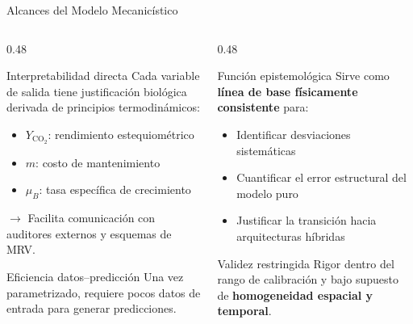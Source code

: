 \documentclass[aspectratio=169, 11pt]{beamer}
\begin{document}
\begin{frame}{Alcances del Modelo Mecanicístico}
\begin{columns}[T]
\begin{column}{0.48\textwidth}
\begin{block}{Interpretabilidad directa}
Cada variable de salida tiene justificación biológica derivada de principios termodinámicos:
\begin{itemize}
    \item $Y_{\text{CO}_2}$: rendimiento estequiométrico
    \item $m$: costo de mantenimiento
    \item $\mu_B$: tasa específica de crecimiento
\end{itemize}
$\rightarrow$ Facilita comunicación con auditores externos y esquemas de MRV.
\end{block}
\vspace{0.2cm}
\begin{exampleblock}{Eficiencia datos--predicción}
Una vez parametrizado, requiere pocos datos de entrada para generar predicciones.
\end{exampleblock}
\end{column}
\begin{column}{0.48\textwidth}
\begin{block}{Función epistemológica}
Sirve como \textbf{línea de base físicamente consistente} para:
\begin{itemize}
    \item Identificar desviaciones sistemáticas
    \item Cuantificar el error estructural del modelo puro
    \item Justificar la transición hacia arquitecturas híbridas
\end{itemize}
\end{block}
\vspace{0.2cm}
\begin{alertblock}{Validez restringida}
Rigor dentro del rango de calibración y bajo supuesto de \textbf{homogeneidad espacial y temporal}.
\end{alertblock}
\end{column}
\end{columns}
\end{frame}
\end{document}
